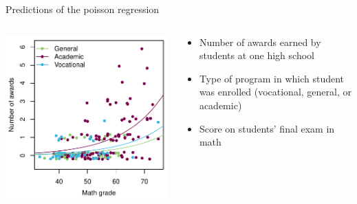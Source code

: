 \documentclass[aspectratio=169]{beamer}
\begin{document}
\begin{frame}{Predictions of the poisson regression}
\begin{columns}[c]
\begin{column}{6cm}
  \includegraphics[scale=.7]{../figures/pois_pre}
\end{column}
\begin{column}{5cm}
  \begin{itemize}
    \item Number of awards earned by students at one high school
    \item Type of program in which student was enrolled (vocational,
    general, or academic)
    \item Score on students' final exam in math
  \end{itemize}
\end{column}
\end{columns}
\end{frame}
\end{document}
